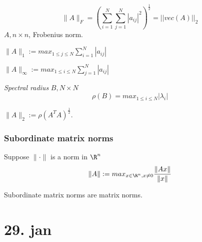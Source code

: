 \begin{example}
  $$\| A \|_{F} = \left(\sum_{i=1}^N \sum_{j=1}^N |a_{ij}|^2  \right)^{\frac{1}{2}}=||vec(A)||_2$$
  $A, n\times n$, Frobenius norm.
\end{example}
\begin{example}
  $\| A \|_{1}:=max_{1\leq j \leq N}\sum_{i=1}^N |a_{ij}| $
\end{example}
\begin{example}
  $\| A \|_{\infty} :=max_{1\leq i \leq N}\sum_{j=1}^N|a_{ij}|$
\end{example}
\begin{definition}
  \emph{Spectral radius}
  \newline $B, N\times N$
    $$\rho (B)=max_{1\leq i \leq N} |\lambda_i |$$
\end{definition}
\begin{example}
  $\| A \|_{2} := \rho(A^TA)^{\frac{1}{2}}$.
\end{example}

\subsubsection*{Subordinate matrix norms}
Suppose $\| \cdot \| $ is a norm in $\R^n$
  $$\| A \|:=max_{x\in \R^n, x\neq 0}\frac{\| Ax\|}{\| x \| }$$
\begin{proposition}
  Subordinate matrix norms are matrix norms.
\end{proposition}

\section{29. jan}
